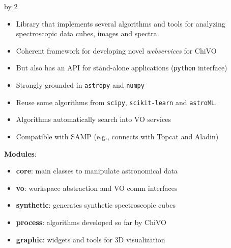 \documentclass[11pt]{scrartcl}
\def\anzspalten{2}
\newlength{\kastenwidth}
\newenvironment{kasten}{
  \begin{lrbox}{\dummybox}
    \begin{minipage}{\linewidth}}
    {\end{minipage}
  \end{lrbox}
  \raisebox{-\depth}{\psshadowbox[cornersize=absolute,linearc=14pt,framesep=1em]{\usebox{\dummybox}}}\\[0.5em]}
\newenvironment{spalte}{
  \setlength\kastenwidth{1.2\textwidth}
  \divide\kastenwidth by \anzspalten
  \begin{minipage}[t]{\kastenwidth}}{\end{minipage}}
\begin{document}
\begin{lrbox}{\spalten}
{\begin{spalte}
\begin{kasten}
\begin{minipage}{0.5\textwidth}
\begin{itemize}
\item Library that implements several algorithms and
tools for analyzing spectroscopic data cubes, images and spectra.
\item Coherent framework for developing novel \emph{webservices} for ChiVO
\item But also has an API for stand-alone applications (\texttt{python} interface)
\item Strongly grounded in \texttt{astropy} and \texttt{numpy}
\item Reuse some algorithms from \texttt{scipy}, \texttt{scikit-learn} and
\texttt{astroML}.
\item Algorithms automatically search into VO services 
\item Compatible with SAMP (e.g., connects with Topcat and Aladin)
\end{itemize}
\textbf{Modules}:
\begin{itemize}
\item \textbf{core}: main classes to manipulate astronomical data
\item \textbf{vo}: workspace abstraction and VO comm interfaces
\item \textbf{synthetic}: generates synthetic spectroscopic cubes
\item \textbf{process}: algorithms developed so far by ChiVO
\item \textbf{graphic}: widgets and tools for 3D visualization  
\end{itemize}

		\end{minipage} 
\mbox{}\\
      
\end{kasten}\hfill

	\begin{kasten}

\end{kasten}
\end{spalte}}
\end{lrbox}
\end{document}
